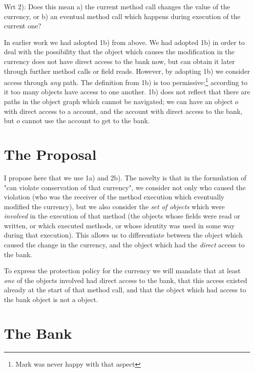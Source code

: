\documentclass[preprint,10pt]{sigplanconf}
\begin{document}
Wrt 2): Does this mean a) the current method call changes the value of the currency, or b) an eventual method call which happens during execution  of the current one? 

 In earlier work we had adopted  1b) from above. 
We had adopted 1b) in order to deal with the 
possibility that   the object which causes the modification in the currency
does not have direct access to the bank now, but can obtain it later through 
further method calls or field reads. However, by adopting 1b) we consider   access through {\em any} path.
The definition from 1b) is too permissive:\footnote{Mark was never happy with that aspect} according to 
it  too many  objects have access to one another.
1b) does not reflect that there are paths in the  object graph which cannot  be navigated; \eg
 we can have 
an object $o$ with direct access to a  account, and the account with direct access to the bank, but $o$ cannot use the account to get to the bank.

\section{The Proposal}
 I propose here that we use 1a) and 2b). The novelty  is 
 that in the formulation of "can violate conservation of that currency", we consider not only who caused the violation
 (\ie who was the receiver of the method execution which eventually modified the currency), but we
 also  consider  the  {\em set of objects} which were {\em involved} in the execution of that method (\ie  the  objects whose fields were read
 or written, or which executed methods, or whose identity was used in some way during that
 execution).
 This allows us to differentiate between the object which caused the change in the currency, and the object which
 had the {\em direct} access to the bank. 
 
 \vspace{.1cm}
   To express the protection policy for the currency we will mandate that at least {\em one} of the objects involved had 
   direct access to the bank,   that this access existed already at the start of that method call, and that the object which had access to the bank
   object is  not a  object. 




\section{The Bank}
\label{s-example}
\end{document}
